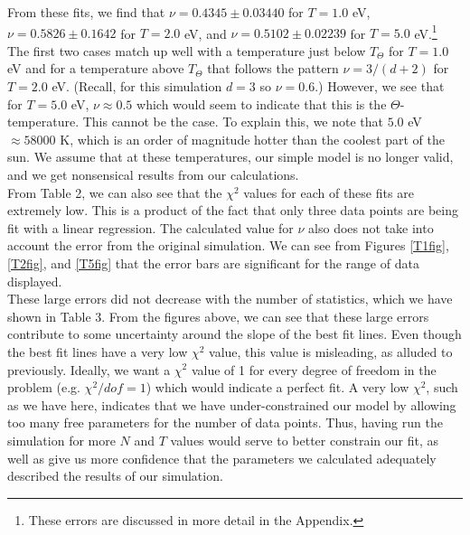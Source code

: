 \documentclass{article}
\begin{document}
\begin{multicols}{2}
From these fits, we find that $\nu = 0.4345 \pm 0.03440$ for $T=1.0$ eV, $\nu = 0.5826 \pm 0.1642$ for $T = 2.0$ eV, and $\nu = 0.5102 \pm 0.02239$ for $T = 5.0$ eV.\footnote{These errors are discussed in more detail in the Appendix.}  The first two cases match up well with a temperature just below $T_{\Theta}$ for $T=1.0$ eV and for a temperature above $T_{\Theta}$ that follows the pattern $\nu = 3/(d+2)$ for $T = 2.0$ eV.  (Recall, for this simulation $d=3$ so $\nu = 0.6$.)  However, we see that for $T = 5.0$ eV, $\nu \approx 0.5$ which would seem to indicate that this is the $\Theta$-temperature. This cannot be the case.  To explain this, we note that $5.0$ eV $\approx 58000$ K, which is an order of magnitude hotter than the coolest part of the sun.  \cite{sun}  We assume that at these temperatures, our simple model is no longer valid, and we get nonsensical results from our calculations.  \\

From Table 2, we can also see that the $\chi^2$ values for each of these fits are extremely low.  This is a product of the fact that only three data points are being fit with a linear regression.  The calculated value for $\nu$ also does not take into account the error from the original simulation.  We can see from Figures \ref{T1fig}, \ref{T2fig}, and \ref{T5fig} that the error bars are significant for the range of data displayed.\\

These large errors did not decrease with the number of statistics, which we have shown in Table 3.  From the figures above, we can see that these large errors contribute to some uncertainty around the slope of the best fit lines.  Even though the best fit lines have a very low $\chi ^2$ value, this value is misleading, as alluded to previously.  Ideally, we want a $\chi^2$ value of 1 for every degree of freedom in the problem (e.g. $\chi ^2/dof =1$) which would indicate a perfect fit.  A very low $\chi ^2$, such as we have here, indicates that we have under-constrained our model by allowing too many free parameters for the number of data points. Thus, having run the simulation for more $N$ and $T$ values would serve to better constrain our fit, as well as give us more confidence that the parameters we calculated adequately described the results of our simulation.  \\


\end{multicols}
\end{document}
